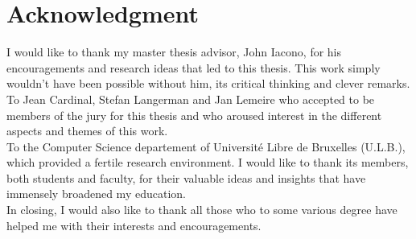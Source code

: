 \newenvironment{vcenterpage}
{\newpage\thispagestyle{empty} 
\vspace*{\fill}}
{\vspace*{\fill}\par\pagebreak}

\chapter*{Acknowledgment}
\thispagestyle{empty} 

I would like to thank my master thesis advisor, John Iacono, for his encouragements and research ideas that led to this thesis. This work simply wouldn't have been possible without him, its critical thinking and clever remarks.\\


To Jean Cardinal, Stefan Langerman and Jan Lemeire who accepted to be members of the jury for this thesis and who aroused interest in the different aspects and themes of this work.\\


To the Computer Science departement of Université Libre de Bruxelles (U.L.B.), which provided a fertile research environment. I would like to thank its members, both students and faculty, for their valuable ideas and insights that have immensely broadened my education.\\

In closing, I would also like to thank all those who to some various degree have helped me with their interests and encouragements.

\medskip
\thispagestyle{empty} 
\setcounter{page}{0}
\tableofcontents
\mainmatter 